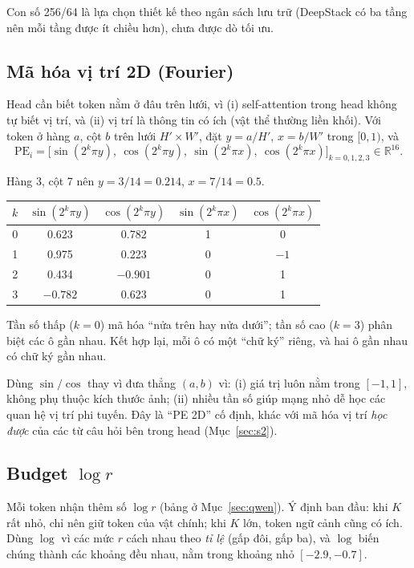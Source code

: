 \documentclass[11pt,a4paper]{article}
\newcommand{\R}{\mathbb{R}}
\begin{document}
\begin{luuy}
Con số 256/64 là lựa chọn thiết kế theo ngân sách lưu trữ (DeepStack có ba tầng nên mỗi tầng được ít chiều hơn), chưa được dò tối ưu.
\end{luuy}

\subsection{Mã hóa vị trí 2D (Fourier)}
Head cần biết token nằm ở đâu trên lưới, vì (i) self-attention trong head không tự biết vị trí, và (ii) vị trí là thông tin có ích (vật thể thường liền khối). Với token ở hàng $a$, cột $b$ trên lưới $H'\times W'$, đặt $y=a/H'$, $x=b/W'$ trong $[0,1)$, và
\begin{equation}
\mathrm{PE}_i=\big[\sin(2^k\pi y),\ \cos(2^k\pi y),\ \sin(2^k\pi x),\ \cos(2^k\pi x)\big]_{k=0,1,2,3}\in\R^{16}.
\end{equation}

\begin{vidu}[: token $j=49$ trên lưới $14\times14$]
Hàng 3, cột 7 nên $y=3/14=0.214$, $x=7/14=0.5$.
\begin{center}
\begin{tabular}{@{}ccccc@{}}
\toprule
$k$ & $\sin(2^k\pi y)$ & $\cos(2^k\pi y)$ & $\sin(2^k\pi x)$ & $\cos(2^k\pi x)$\\
\midrule
0 & 0.623 & 0.782 & 1 & 0\\
1 & 0.975 & 0.223 & 0 & $-1$\\
2 & 0.434 & $-0.901$ & 0 & 1\\
3 & $-0.782$ & 0.623 & 0 & 1\\
\bottomrule
\end{tabular}
\end{center}
Tần số thấp ($k=0$) mã hóa ``nửa trên hay nửa dưới''; tần số cao ($k=3$) phân biệt các ô gần nhau. Kết hợp lại, mỗi ô có một ``chữ ký'' riêng, và hai ô gần nhau có chữ ký gần nhau.
\end{vidu}

\begin{visao}
Dùng $\sin/\cos$ thay vì đưa thẳng $(a,b)$ vì: (i) giá trị luôn nằm trong $[-1,1]$, không phụ thuộc kích thước ảnh; (ii) nhiều tần số giúp mạng nhỏ dễ học các quan hệ vị trí phi tuyến. Đây là ``PE 2D'' cố định, khác với mã hóa vị trí \emph{học được} của các từ câu hỏi bên trong head (Mục~\ref{sec:s2}).
\end{visao}

\subsection{Budget $\log r$}
Mỗi token nhận thêm số $\log r$ (bảng ở Mục~\ref{sec:qwen}). Ý định ban đầu: khi $K$ rất nhỏ, chỉ nên giữ token của vật chính; khi $K$ lớn, token ngữ cảnh cũng có ích. Dùng $\log$ vì các mức $r$ cách nhau theo \emph{tỉ lệ} (gấp đôi, gấp ba), và $\log$ biến chúng thành các khoảng đều nhau, nằm trong khoảng nhỏ $[-2.9,-0.7]$.
\end{document}
